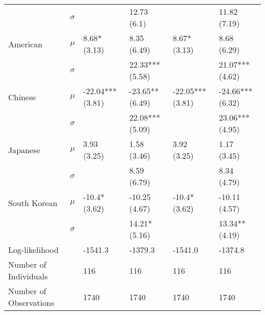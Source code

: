 \begin{tabular}{llllll}
                          &  $\sigma$ &                               &                   12.73 (6.1) &                                &                   11.82 (7.19) \\
                 American &     $\mu$ &                  8.68* (3.13) &                   8.35 (6.49) &                   8.67* (3.13) &                    8.68 (6.29) \\
                          &  $\sigma$ &                               &               22.33*** (5.58) &                                &                21.07*** (4.62) \\
                  Chinese &     $\mu$ &              -22.04*** (3.81) &               -23.65** (6.49) &               -22.05*** (3.81) &               -24.66*** (6.32) \\
                          &  $\sigma$ &                               &               22.08*** (5.09) &                                &                23.06*** (4.95) \\
                 Japanese &     $\mu$ &                   3.93 (3.25) &                   1.58 (3.46) &                    3.92 (3.25) &                    1.17 (3.45) \\
                          &  $\sigma$ &                               &                   8.59 (6.79) &                                &                    8.34 (4.79) \\
             South Korean &     $\mu$ &                 -10.4* (3.62) &                 -10.25 (4.67) &                  -10.4* (3.62) &                  -10.11 (4.57) \\
                          &  $\sigma$ &                               &                 14.21* (5.16) &                                &                 13.34** (4.19) \\
    \hline Log-likelihood &           &                       -1541.3 &                       -1379.3 &                        -1541.0 &                        -1374.8 \\
    Number of Individuals &           &                           116 &                           116 &                            116 &                            116 \\
   Number of Observations &           &                          1740 &                          1740 &                           1740 &                           1740 \\
\bottomrule
\end{tabular}
